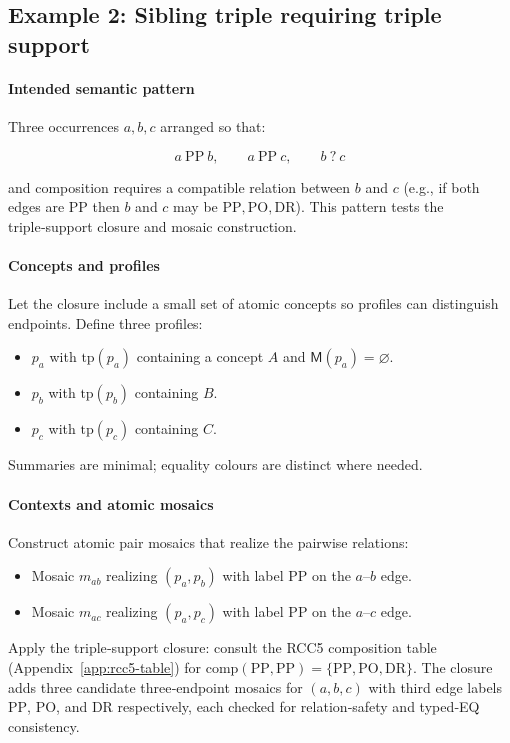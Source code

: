 \documentclass[11pt]{article}
\newcommand{\PP}{\mathrm{PP}}
\newcommand{\DR}{\mathrm{DR}}
\newcommand{\PO}{\mathrm{PO}}
\newcommand{\tp}{\mathrm{tp}}
\begin{document}
\subsection{Example 2: Sibling triple requiring triple support}
\label{app:sibling-triple}

\paragraph{Intended semantic pattern}
Three occurrences \(a,b,c\) arranged so that:


\[
a\ \PP\ b,\qquad a\ \PP\ c,\qquad b\ \mathsf{?}\ c
\]


and composition requires a compatible relation between \(b\) and \(c\)
(e.g., if both edges are $\PP$ then $b$ and $c$ may be $\PP,\PO,\DR$).
This pattern tests the triple‑support closure and mosaic construction.

\paragraph{Concepts and profiles}
Let the closure include a small set of atomic concepts so profiles can
distinguish endpoints. Define three profiles:
\begin{itemize}
  \item $p_a$ with $\tp(p_a)$ containing a concept $A$ and $\mathsf{M}(p_a)=\varnothing$.
  \item $p_b$ with $\tp(p_b)$ containing $B$.
  \item $p_c$ with $\tp(p_c)$ containing $C$.
\end{itemize}
Summaries are minimal; equality colours are distinct where needed.

\paragraph{Contexts and atomic mosaics}
Construct atomic pair mosaics that realize the pairwise relations:
\begin{itemize}
  \item Mosaic $m_{ab}$ realizing $(p_a,p_b)$ with label $\PP$ on the $a$–$b$ edge.
  \item Mosaic $m_{ac}$ realizing $(p_a,p_c)$ with label $\PP$ on the $a$–$c$ edge.
\end{itemize}
Apply the triple‑support closure: consult the RCC5 composition table
(Appendix~\ref{app:rcc5-table}) for $\mathrm{comp}(\PP,\PP)=\{\PP,\PO,\DR\}$.
The closure adds three candidate three‑endpoint mosaics for $(a,b,c)$ with
third edge labels $\PP$, $\PO$, and $\DR$ respectively, each checked for
relation‑safety and typed‑EQ consistency.
\end{document}
